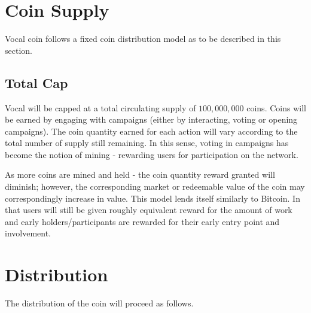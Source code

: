 \documentclass[conference]{IEEEtran}
\begin{document}

    
    \section{Coin Supply}

   Vocal coin follows a fixed coin distribution model as to be described in this section.

    \subsection{Total Cap}
   Vocal will be capped at a total circulating supply of $100,000,000$ coins. Coins will be earned by engaging with campaigns (either by interacting, voting or opening campaigns).
     The coin quantity earned for each action will vary according to the total number of supply still remaining. In this sense, voting in campaigns has become the notion of mining - rewarding users for participation on the network.

     As more coins are mined and held - the coin quantity reward granted will diminish; however, the corresponding market or redeemable value of the coin may correspondingly increase in value. This model lends itself similarly to Bitcoin. In that users will still be given roughly equivalent reward for the amount of work and early holders/participants are rewarded for their early entry point and involvement.


    \section{Distribution}

    The distribution of the coin will proceed as follows.
\end{document}
